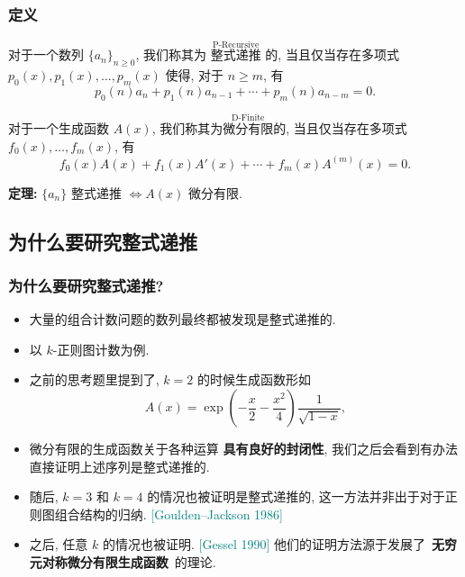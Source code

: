 \documentclass{ctexbeamer}
\newcommand{\cnote}[2][\footnotesize]{\textcolor{teal}{#1[#2]}}
\begin{document}
\begin{frame}
  \frametitle{定义}

  \begin{definition}[整式递推]
    对于一个数列 $\{a_n\}_{n\geq 0}$, 我们称其为
    $\stackrel{\text{P-Recursive}}{\textbf{整式递推}}$ 的, 当且仅当存在多项式
    $p_0(x), p_1(x), \dots, p_m(x)$ 使得, 对于 $n\geq m$, 有
    \begin{equation}
      p_0(n) a_n + p_1(n) a_{n-1} + \cdots + p_m(n) a_{n-m} = 0.
    \end{equation}
  \end{definition}
  \pause
  \begin{definition}[微分有限]
    对于一个生成函数 $A(x)$, 我们称其为$\stackrel{\text{D-Finite}}{\textbf{微分有限}}$的, 当且仅当存在多项式 $f_0(x),\dots,f_m(x)$, 有
    \begin{equation}
      f_0(x) A(x) + f_1(x) A'(x) + \cdots + f_m(x) A^{(m)}(x) = 0.
    \end{equation}
  \end{definition}
  \pause
  \textbf{定理:} $\{a_n\}$ 整式递推 $\iff A(x)$ 微分有限.

\end{frame}

\subsection{为什么要研究整式递推}

\begin{frame}
  \frametitle{为什么要研究整式递推?}

  \begin{itemize}
    \item 大量的组合计数问题的数列最终都被发现是整式递推的.
    \pause
    \item 以 $k$-正则图计数为例.
    \item 之前的思考题里提到了, $k=2$ 的时候生成函数形如
    \begin{equation}
      A(x) = \exp \left( -\frac x 2 - \frac{x^2}{4} \right) \frac 1{\sqrt{1-x}},
    \end{equation}
    \item 微分有限的生成函数关于各种运算 \textbf{具有良好的封闭性}, 我们之后会看到有办法直接证明上述序列是整式递推的.
    \pause
    \item 随后, $k=3$ 和 $k=4$ 的情况也被证明是整式递推的, 这一方法并非出于对于正则图组合结构的归纳. \cnote{Goulden--Jackson 1986}
    \item 之后, 任意 $k$ 的情况也被证明. \cnote{Gessel 1990} 他们的证明方法源于发展了~\textbf{无穷元对称微分有限生成函数}~的理论.
  \end{itemize}

\end{frame}
\end{document}
